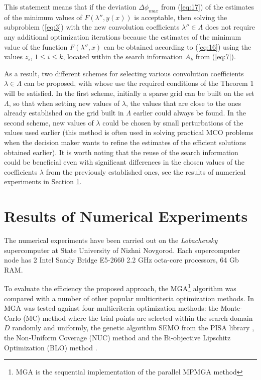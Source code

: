 \documentclass[runningheads]{llncs}
\begin{document}
This statement means that if the deviation $\Delta \phi_{max}$ from (\ref{eq:17}) of the estimates of the minimum values of $F(\lambda'',y(x))$ is acceptable, then solving the subproblem (\ref{eq:3}) with the new convolution coefficients $\lambda'' \in \Lambda$ does not require any additional optimization iterations because the estimates of the minimum value of the function $F(\lambda'',x)$ can be obtained according to (\ref{eq:16}) using the values $z_i$, $1 \leq i \leq k$, located within the search information $A_k$ from (\ref{eq:7}).

As a result, two different schemes for selecting various convolution coefficients $\lambda \in \Lambda$ can be proposed, with whose use the required conditions of the Theorem 1 will be satisfied. In the first scheme, initially a sparse grid can be built on the set $\Lambda$, so that when setting new values of $\lambda$, the values that are close to the ones already established on the grid built in $\Lambda$ earlier could always be found. In the second scheme, new values of $\lambda$ could be chosen by small perturbations of the values used earlier (this method is often used in solving practical MCO problems when the decision maker wants to refine the estimates of the efficient solutions obtained earlier). It is worth noting that the reuse of the search information could be beneficial even with significant differences in the chosen values of the coefficients $\lambda$ from the previously established ones, see the results of numerical experiments in Section \ref{sec:4}.


\section{Results of Numerical Experiments}
\label{sec:4}

The numerical experiments have been carried out on the \textit{Lobachevsky} supercomputer at State University of Nizhni Novgorod. Each supercomputer node has 2 Intel Sandy Bridge E5-2660 2.2 GHz octa-core processors, 64 Gb RAM. 

To evaluate the efficiency the proposed approach, the MGA\footnote{MGA is the sequential implementation of the parallel MPMGA method} algorithm was compared with a number of other popular multicriteria optimization methods. In \cite{c20} MGA was tested against four multicriteria optimization methods: the Monte-Carlo (MC) method where the trial points are selected within the search domain $D$ randomly and uniformly, the genetic algorithm SEMO from the PISA library \cite{c21}, the Non-Uniform Coverage (NUC) method \cite{c17} and the Bi-objective Lipschitz Optimization (BLO) method \cite{c18}.
\end{document}
